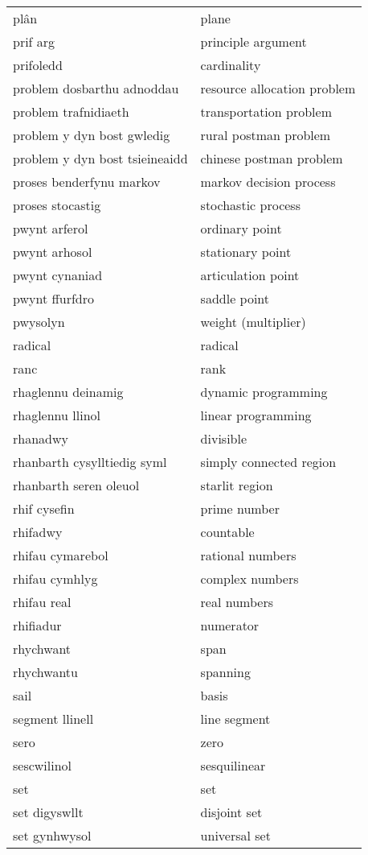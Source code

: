 \begin{supertabular}{p{0.22\textwidth}p{0.22\textwidth}}
plân & plane \\
prif arg & principle argument \\
prifoledd & cardinality \\
problem dosbarthu adnoddau & resource allocation problem \\
problem trafnidiaeth & transportation problem \\
problem y dyn bost gwledig & rural postman problem \\
problem y dyn bost tsieineaidd & chinese postman problem \\
proses benderfynu markov & markov decision process \\
proses stocastig & stochastic process \\
pwynt arferol & ordinary point \\
pwynt arhosol & stationary point \\
pwynt cynaniad & articulation point \\
pwynt ffurfdro & saddle point \\
pwysolyn & weight (multiplier) \\
radical & radical \\
ranc & rank \\
rhaglennu deinamig & dynamic programming \\
rhaglennu llinol & linear programming \\
rhanadwy & divisible \\
rhanbarth cysylltiedig syml & simply connected region \\
rhanbarth seren oleuol & starlit region \\
rhif cysefin & prime number \\
rhifadwy & countable \\
rhifau cymarebol & rational numbers \\
rhifau cymhlyg & complex numbers \\
rhifau real & real numbers \\
rhifiadur & numerator \\
rhychwant & span \\
rhychwantu & spanning \\
sail & basis \\
segment llinell & line segment \\
sero & zero \\
sescwilinol & sesquilinear \\
set & set \\
set digyswllt & disjoint set \\
set gynhwysol & universal set \\

\end{supertabular}
